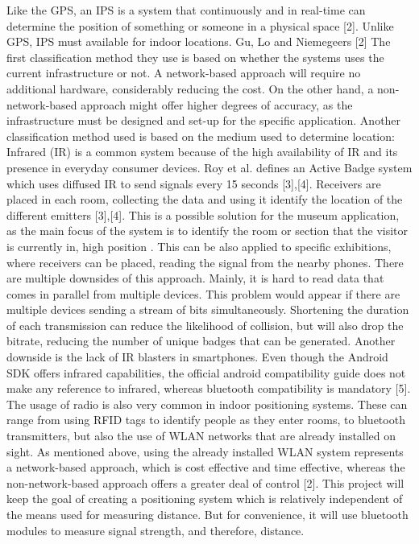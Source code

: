 Like the GPS, an IPS is a system that continuously and in real-time can determine the position of something or someone in a physical space [2]. Unlike GPS, IPS must available for indoor locations. Gu, Lo and Niemegeers [2] 
The first classification method they use is based on whether the systems uses the current infrastructure or not. A network-based approach will require no additional hardware, considerably reducing the cost. On the other hand, a non-network-based approach might offer higher degrees of accuracy, as the infrastructure must be designed and set-up for the specific application. Another classification method used is based on the medium used to determine location: Infrared (IR) is a common system because of the high availability of IR and its presence in everyday consumer devices. Roy et al. defines an Active Badge system which uses diffused IR to send signals every 15 seconds [3],[4]. Receivers are placed in each room, collecting the data and using it identify the location of the different emitters [3],[4]. This is a possible solution for the museum application, as the main focus of the system is to identify the room or section that the visitor is currently in, high position . This can be also applied to specific exhibitions, where receivers can be placed, reading the signal from the nearby phones. There are multiple downsides of this approach. Mainly, it is hard to read data that comes in parallel from multiple devices. This problem would appear if there are multiple devices sending a stream of bits simultaneously. Shortening the duration of each transmission can reduce the likelihood of collision, but will also drop the bitrate, reducing the number of unique badges that can be generated. Another downside is the lack of IR blasters in smartphones. Even though the Android SDK offers infrared capabilities, the official android compatibility guide does not make any reference to infrared, whereas bluetooth compatibility is mandatory [5]. The usage of radio is also very common in indoor positioning systems. These can range from using RFID tags to identify people as they enter rooms, to bluetooth transmitters, but also the use of WLAN networks that are already installed on sight. As mentioned above, using the already installed WLAN system represents a network-based approach, which is cost effective and time effective, whereas the non-network-based approach offers a greater deal of control [2]. This project will keep the goal of creating a positioning system which is relatively independent of the means used for measuring distance. But for convenience, it will use bluetooth modules to measure signal strength, and therefore, distance.

